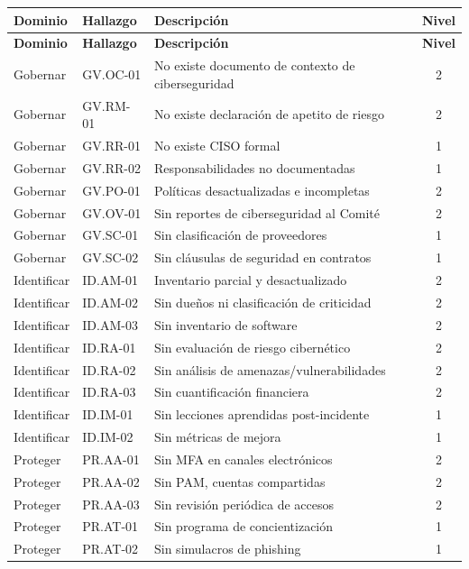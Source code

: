 \documentclass[11pt,a4paper]{article}
\begin{document}
	\begin{longtable}{@{}p{2cm}p{2cm}p{6.5cm}c@{}}
		\toprule
		\textbf{Dominio} & \textbf{Hallazgo} & \textbf{Descripción} & \textbf{Nivel} \\ \midrule
		\endfirsthead
		\toprule
		\textbf{Dominio} & \textbf{Hallazgo} & \textbf{Descripción} & \textbf{Nivel} \\ \midrule
		\endhead
		Gobernar & GV.OC-01 & No existe documento de contexto de ciberseguridad & 2 \\
		Gobernar & GV.RM-01 & No existe declaración de apetito de riesgo & 2 \\
		Gobernar & GV.RR-01 & No existe CISO formal & 1 \\
		Gobernar & GV.RR-02 & Responsabilidades no documentadas & 1 \\
		Gobernar & GV.PO-01 & Políticas desactualizadas e incompletas & 2 \\
		Gobernar & GV.OV-01 & Sin reportes de ciberseguridad al Comité & 2 \\
		Gobernar & GV.SC-01 & Sin clasificación de proveedores & 1 \\
		Gobernar & GV.SC-02 & Sin cláusulas de seguridad en contratos & 1 \\ \midrule
		Identificar & ID.AM-01 & Inventario parcial y desactualizado & 2 \\
		Identificar & ID.AM-02 & Sin dueños ni clasificación de criticidad & 2 \\
		Identificar & ID.AM-03 & Sin inventario de software & 2 \\
		Identificar & ID.RA-01 & Sin evaluación de riesgo cibernético & 2 \\
		Identificar & ID.RA-02 & Sin análisis de amenazas/vulnerabilidades & 2 \\
		Identificar & ID.RA-03 & Sin cuantificación financiera & 2 \\
		Identificar & ID.IM-01 & Sin lecciones aprendidas post-incidente & 1 \\
		Identificar & ID.IM-02 & Sin métricas de mejora & 1 \\ \midrule
		Proteger & PR.AA-01 & Sin MFA en canales electrónicos & 2 \\
		Proteger & PR.AA-02 & Sin PAM, cuentas compartidas & 2 \\
		Proteger & PR.AA-03 & Sin revisión periódica de accesos & 2 \\
		Proteger & PR.AT-01 & Sin programa de concientización & 1 \\
		Proteger & PR.AT-02 & Sin simulacros de phishing & 1 \\

\end{longtable}
\end{document}
